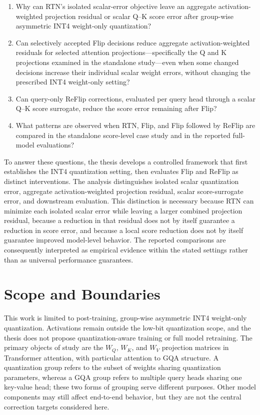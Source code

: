 \begin{enumerate}
    \item Why can RTN's isolated scalar-error objective leave an aggregate activation-weighted projection residual or scalar Q--K score error after group-wise asymmetric INT4 weight-only quantization?
    \item Can selectively accepted Flip decisions reduce aggregate activation-weighted residuals for selected attention projections---specifically the Q and K projections examined in the standalone study---even when some changed decisions increase their individual scalar weight errors, without changing the prescribed INT4 weight-only setting?
    \item Can query-only ReFlip corrections, evaluated per query head through a scalar Q--K score surrogate, reduce the score error remaining after Flip?
    \item What patterns are observed when RTN, Flip, and Flip followed by ReFlip are compared in the standalone score-level case study and in the reported full-model evaluations?
\end{enumerate}

To answer these questions, the thesis develops a controlled framework that first establishes the INT4 quantization setting, then evaluates Flip and ReFlip as distinct interventions. The analysis distinguishes isolated scalar quantization error, aggregate activation-weighted projection residual, scalar score-surrogate error, and downstream evaluation. This distinction is necessary because RTN can minimize each isolated scalar error while leaving a larger combined projection residual, because a reduction in that residual does not by itself guarantee a reduction in score error, and because a local score reduction does not by itself guarantee improved model-level behavior. The reported comparisons are consequently interpreted as empirical evidence within the stated settings rather than as universal performance guarantees.

\section{Scope and Boundaries}

This work is limited to post-training, group-wise asymmetric INT4 weight-only quantization. Activations remain outside the low-bit quantization scope, and the thesis does not propose quantization-aware training or full model retraining. The primary objects of study are the \(W_Q\), \(W_K\), and \(W_V\) projection matrices in Transformer attention, with particular attention to GQA structure. A quantization group refers to the subset of weights sharing quantization parameters, whereas a GQA group refers to multiple query heads sharing one key-value head; these two forms of grouping serve different purposes. Other model components may still affect end-to-end behavior, but they are not the central correction targets considered here.

